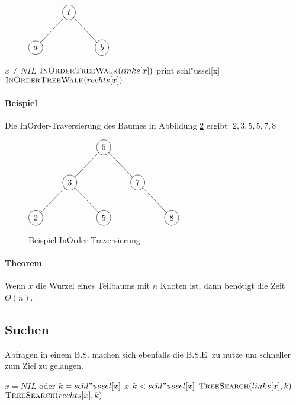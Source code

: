 \documentclass[a4paper]{scrartcl}
\begin{document}
\begin{figure}[htb]
	\centering
	$\begin{xy}
		\entrymodifiers={++[o][F-]}
		\xymatrix {
	  	*{} & t \ar@{-}[rd]\ar@{-}[ld] & *{} \\
	  	a & *{} & b\\
		}
	\end{xy}$
	\label{tree1}
\end{figure}

\begin{codebox}
\li \If $x \neq NIL$
\li		\Then $\textnormal{\scshape InOrderTreeWalk}(links[x])$
		\End
\li	print schl"ussel[x]
\li $\textnormal{\scshape InOrderTreeWalk}(rechts[x])$
\end{codebox}

\paragraph{Beispiel}
Die InOrder-Traversierung des Baumes in Abbildung \ref{tree3} ergibt: $2,3,5,5,7,8$
\begin{figure}[htb]
	\centering
	$\begin{xy}
		\entrymodifiers={++[o][F-]}
		\xymatrix {
	  	*{} & *{}  & 5 \ar@{-}[rd]\ar@{-}[ld] & *{} & *{} \\
	  	*{} & 3 \ar@{-}[rd]\ar@{-}[ld]& *{} & 7 \ar@{-}[rd] & *{} \\
	  	2 & *{} & 5 & *{} & 8 \\
		}
	\end{xy}$
	\caption{Beispiel InOrder-Traversierung}
	\label{tree3}
\end{figure}

\paragraph{Theorem}

Wenn $x$ die Wurzel eines Teilbaums mit $n$ Knoten ist, dann benötigt 
 die Zeit $O(n)$.

\subsection{Suchen}
Abfragen in einem B.S. machen sich ebenfalls die B.S.E. zu nutze um schneller zum Ziel zu gelangen.
\begin{codebox}
\li \If $x = NIL$ oder $k=schl"ussel[x]$
\li 	\Then \Return $x$
		\End
\li	\If $k < schl"ussel[x]$
\li 	\Then \Return $\textnormal{\scshape TreeSearch}(links[x], k)$
\li		\Else \Return $\textnormal{\scshape TreeSearch}(rechts[x], k)$
		\End
\end{codebox}
\end{document}

